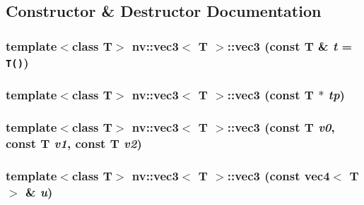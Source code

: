 \subsection{Constructor \& Destructor Documentation}
\hypertarget{classnv_1_1vec3_9af8f0a565b0a72e2de05828dc8fd136}{
\subsubsection[{vec3}]{\setlength{\rightskip}{0pt plus 5cm}template$<$class T$>$ {\bf nv::vec3}$<$ T $>$::{\bf vec3} (const T \& {\em t} = {\tt T()})}}
\label{classnv_1_1vec3_9af8f0a565b0a72e2de05828dc8fd136}


\hypertarget{classnv_1_1vec3_1185f99bce68e1e55ff562614670540b}{
\subsubsection[{vec3}]{\setlength{\rightskip}{0pt plus 5cm}template$<$class T$>$ {\bf nv::vec3}$<$ T $>$::{\bf vec3} (const T $\ast$ {\em tp})}}
\label{classnv_1_1vec3_1185f99bce68e1e55ff562614670540b}


\hypertarget{classnv_1_1vec3_00cd5e741e65a508fe47e646ccdd18de}{
\subsubsection[{vec3}]{\setlength{\rightskip}{0pt plus 5cm}template$<$class T$>$ {\bf nv::vec3}$<$ T $>$::{\bf vec3} (const T {\em v0}, \/  const T {\em v1}, \/  const T {\em v2})}}
\label{classnv_1_1vec3_00cd5e741e65a508fe47e646ccdd18de}


\hypertarget{classnv_1_1vec3_cb8594a208cc19189a10d144b9188e7b}{
\subsubsection[{vec3}]{\setlength{\rightskip}{0pt plus 5cm}template$<$class T$>$ {\bf nv::vec3}$<$ T $>$::{\bf vec3} (const {\bf vec4}$<$ T $>$ \& {\em u})}}
\label{classnv_1_1vec3_cb8594a208cc19189a10d144b9188e7b}


